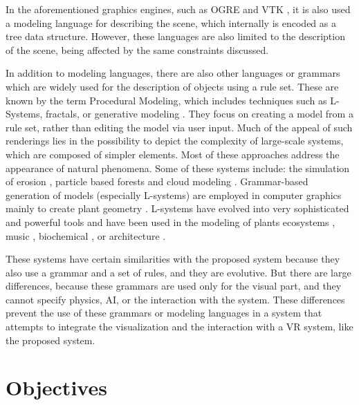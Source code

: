 \documentclass[12pt]{article}
\begin{document}
In the aforementioned graphics engines, such as OGRE \cite{OGRE} and VTK \cite{VTK}, it is also
used a modeling language for describing the scene, which internally is encoded as a tree data
structure. However, these languages are also limited to the description of the scene, being
affected by the same constraints discussed.

In addition to modeling languages, there are also other languages or grammars which are widely used
for the description of objects using a rule set. These are known by the term Procedural Modeling,
which includes techniques such as L-Systems, fractals, or generative modeling \cite{Yoav2001}. They
focus on creating a model from a rule set, rather than editing the model via user input. Much of
the appeal of such renderings lies in the possibility to depict the complexity of large-scale
systems, which are composed of simpler elements. Most of these approaches address the appearance of
natural phenomena. Some of these systems include: the simulation of erosion \cite{Musgrave1990},
particle based forests \cite{Reeves1985} and cloud modeling \cite{Perlin1985}. Grammar-based
generation of models (especially L-systems) are employed in computer graphics mainly to create
plant geometry \cite{Lindenmayer1990,Lindenmayer1992}. L-systems have evolved into very
sophisticated and powerful tools \cite{Prusinkiewicz2008,Palubicki2009} and have been used in the
modeling of plants ecosystems \cite{Prusinkiewicz2000}, music \cite{Manousakis2006}, biochemical
\cite{Spicher2008}, or architecture \cite{Yoav2001,Muller2006,Wang2008}.

These systems have certain similarities with the proposed system because they also use a grammar
and a set of rules, and they are evolutive. But there are large differences, because these grammars
are used only for the visual part, and they cannot specify physics, AI, or the interaction with the
system. These differences prevent the use of these grammars or modeling languages in a system that
attempts to integrate the visualization and the interaction with a VR system, like the proposed
system.




\section{Objectives
\label{sec:objectives}}
\end{document}
